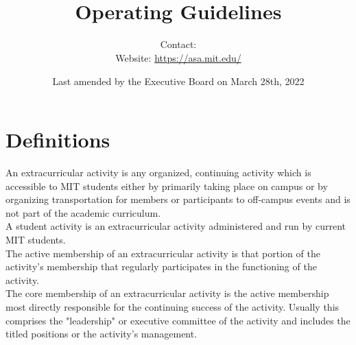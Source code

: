 \documentclass[12pt]{article}
\def\doctype{Operating Guidelines}
\begin{document}
\title{\groupname\\ \doctype}
\author{%
    Contact:  \\
    Website: \url{https://asa.mit.edu/}
}
\date{Last amended by the Executive Board on March 28th, 2022}

\maketitle

\tableofcontents

\label{art:groups}

\section{Definitions}
An extracurricular activity is any organized, continuing activity which is accessible to MIT students
either by primarily taking place on campus or by organizing transportation for members or participants to
off-campus events and is not part of the academic curriculum.
\\

A student activity is an extracurricular activity administered and run by current MIT students.
\\

The active membership of an extracurricular activity is that portion of the activity’s membership that
regularly participates in the functioning of the activity.
\\

The core membership of an extracurricular activity is the active membership most directly responsible
for the continuing success of the activity. Usually this comprises the "leadership" or executive
committee of the activity and includes the titled positions or the activity’s management.
\end{document}
